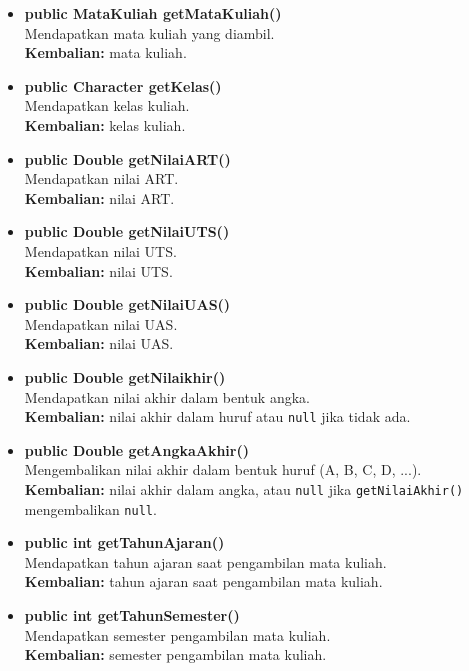 \documentclass[a4paper,twoside]{article}
\begin{document}
\begin{enumerate}
\begin{enumerate}
\begin{enumerate}
\begin{enumerate}
\begin{itemize}
			\item \textbf{public MataKuliah getMataKuliah()}\\
				Mendapatkan mata kuliah yang diambil.\\
				\textbf{Kembalian:} mata kuliah.
				
			\item \textbf{public Character getKelas()}\\
				Mendapatkan kelas kuliah.\\
				\textbf{Kembalian:} kelas kuliah.
				
			\item \textbf{public Double getNilaiART()}\\
				Mendapatkan nilai ART.\\
				\textbf{Kembalian:} nilai ART.
				
			\item \textbf{public Double getNilaiUTS()}\\
				Mendapatkan nilai UTS.\\
				\textbf{Kembalian:} nilai UTS.
				
			\item \textbf{public Double getNilaiUAS()}\\
				Mendapatkan nilai UAS.\\
				\textbf{Kembalian:} nilai UAS.
				
			\item \textbf{public Double getNilaikhir()}\\
				Mendapatkan nilai akhir dalam bentuk angka.\\
				\textbf{Kembalian:} nilai akhir dalam huruf atau \texttt{null} jika tidak ada.
			
			\item \textbf{public Double getAngkaAkhir()}\\
				Mengembalikan nilai akhir dalam bentuk huruf (A, B, C, D, ...).\\
				\textbf{Kembalian:} nilai akhir dalam angka, atau \texttt{null} jika \texttt{getNilaiAkhir()} mengembalikan \texttt{null}.
			
			\item \textbf{public int getTahunAjaran()}\\
				Mendapatkan tahun ajaran saat pengambilan mata kuliah.\\
				\textbf{Kembalian:} tahun ajaran saat pengambilan mata kuliah.
			
			\item \textbf{public int getTahunSemester()}\\
				Mendapatkan semester pengambilan mata kuliah.\\
				\textbf{Kembalian:} semester pengambilan mata kuliah.	
		\end{itemize}
		

\end{enumerate}
\end{enumerate}
\end{enumerate}
\end{enumerate}
\end{document}
